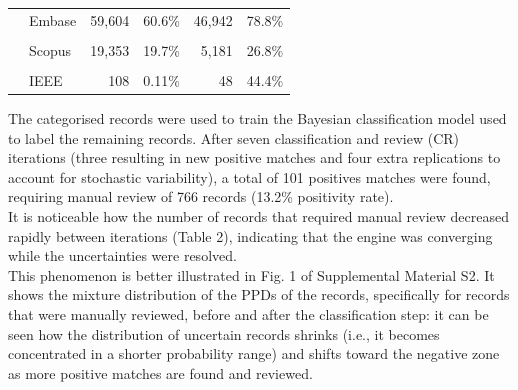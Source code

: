 \documentclass{article}
\begin{document}
\begin{table}[!h]
{\begin{tabular}[t]{llrlrl}
 & Embase & 59,604 & 60.6\% & 46,942 & 78.8\%\\
\cellcolor{gray!6}{} & \cellcolor{gray!6}{Pubmed} & \cellcolor{gray!6}{37,278} & \cellcolor{gray!6}{37.9\%} & \cellcolor{gray!6}{21,371} & \cellcolor{gray!6}{57.3\%}\\
\addlinespace
 & Scopus & 19,353 & 19.7\% & 5,181 & 26.8\%\\
\cellcolor{gray!6}{} & \cellcolor{gray!6}{WOS} & \cellcolor{gray!6}{14,367} & \cellcolor{gray!6}{14.6\%} & \cellcolor{gray!6}{3,175} & \cellcolor{gray!6}{22.1\%}\\
 & IEEE & 108 & 0.11\% & 48 & 44.4\%\\
\bottomrule
\end{tabular}}
\end{table}

The categorised records were used to train the Bayesian classification
model used to label the remaining records. After seven classification
and review (CR) iterations (three resulting in new positive matches and
four extra replications to account for stochastic variability), a total
of 101 positives matches were found, requiring manual review of 766
records (13.2\% positivity rate).\\
It is noticeable how the number of records that required manual review
decreased rapidly between iterations (Table 2), indicating that the
engine was converging while the uncertainties were resolved.\\
This phenomenon is better illustrated in Fig. 1 of Supplemental Material
S2. It shows the mixture distribution of the PPDs of the records,
specifically for records that were manually reviewed, before and after
the classification step: it can be seen how the distribution of
uncertain records shrinks (i.e., it becomes concentrated in a shorter
probability range) and shifts toward the negative zone as more positive
matches are found and reviewed.
\end{document}
